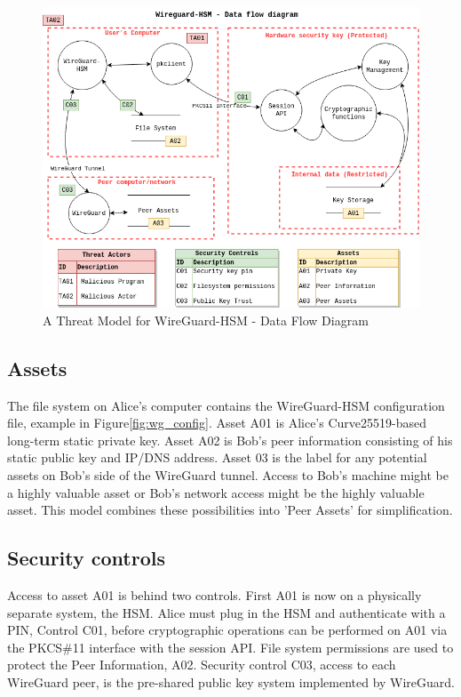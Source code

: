 \documentclass [11pt, proquest] {uwthesis}[2020/02/24]
\begin{document}
\begin{figure}[H]
\centering
\includegraphics[width=15cm]{paper/images/WGHSM_DFD.png}
\caption{A Threat Model for WireGuard-HSM - Data Flow Diagram}
\label{fig:wg_hsm_dfd}
\end{figure}

\subsection{Assets}
The file system on Alice's computer contains the WireGuard-HSM configuration file, example in Figure\ref{fig:wg_config}. 
Asset A01 is Alice's Curve25519-based long-term static private key. Asset A02 is Bob's peer information consisting of his static public key and IP/DNS address.
Asset 03 is the label for any potential assets on Bob's side of the WireGuard tunnel. Access to Bob's machine might be a highly valuable asset or Bob's network access might be the highly valuable asset. This model combines these possibilities into 'Peer Assets' for simplification.

\subsection{Security controls}
Access to asset A01 is behind two controls. First A01 is now on a physically separate system, the HSM. Alice must plug in the HSM and authenticate with a PIN, Control C01, before cryptographic operations can be performed on A01 via the PKCS\#11 interface with the session API.
File system permissions are used to protect the Peer Information, A02.
Security control C03, access to each WireGuard peer, is the pre-shared public key system implemented by WireGuard.
\end{document}

